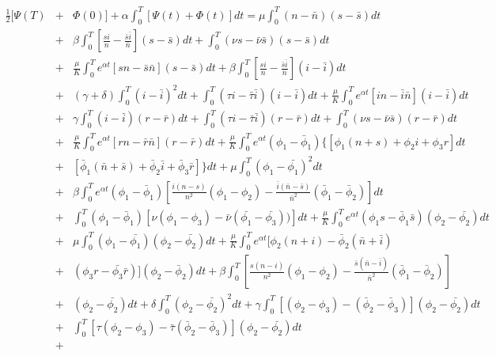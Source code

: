 \begin{eqnarray*}
\frac{1}{2}[\Psi(T)&+&\Phi(0)]+\alpha\int_{0}^{T}[\Psi(t)+\Phi(t)]dt=\mu\int_{0}^{T}(n-\bar{n})(s-\bar{s})dt\\
&+&\beta\int_{0}^{T}\left[\frac{si}{n}-\frac{\bar{s}\bar{i}}{\bar{n}}\right](s-\bar{s})dt+\int_{0}^{T}(\nu
 s-\bar{\nu}\bar{s})(s-\bar{s})dt\\
&+&\frac{\mu}{K}\int_{0}^{T} e^{\alpha 
t}\left[sn-\bar{s}\bar{n}\right](s-\bar{s})dt+\beta\int_{0}^{T}\left[\frac{si}{n}-\frac{\bar{s}\bar{i}}{\bar{n}}\right](i-\bar{i})dt\\
&+&(\gamma+\delta)\int_{0}^{T}(i-\bar{i})^2dt+\int_{0}^{T}(\tau 
i-\bar{\tau}\bar{i})(i-\bar{i})dt+\frac{\mu}{K}\int_{0}^{T} e^{\alpha 
t}\left[in-\bar{i}\bar{n}\right](i-\bar{i})dt\\
&+&\gamma\int_{0}^{T}(i-\bar{i})(r-\bar{r})dt+\int_{0}^{T}(\tau 
i-\bar{\tau}\bar{i})(r-\bar{r})dt+\int_{0}^{T}(\nu 
s-\bar{\nu}\bar{s})(r-\bar{r})dt\\
&+&\frac{\mu}{K}\int_{0}^{T} e^{\alpha 
t}\left[rn-\bar{r}\bar{n}\right](r-\bar{r})dt+\frac{\mu}{K}\int_{0}^{T}e^{\alpha
 t}(\phi_1-\bar{\phi}_1)\{[\phi_1(n+s)+\phi_2 i +\phi_3 r]dt\\
&+&[\bar{\phi}_1(\bar{n}+\bar{s})+\bar{\phi}_2 \bar{i} +\bar{\phi}_3 
\bar{r}]\}dt+\mu\int_{0}^{T}(\phi_1-\bar{\phi_1})^2dt\\
&+&\beta\int_{0}^{T}e^{\alpha 
t}(\phi_1-\bar{\phi}_1)\left[\frac{i(n-s)}{n^2}(\phi_1-\phi_2)-\frac{\bar{i}(\bar{n}-\bar{s})}{\bar{n}^2}(\bar{\phi}_1-\bar{\phi}_2)\right]dt\\
&+&\int_{0}^{T} 
(\phi_1-\bar{\phi}_1)[\nu(\phi_1-\phi_3)-\bar{\nu}(\bar{\phi_1}-\bar{\phi_3}))]dt+\frac{\mu}{K}\int_{0}^{T}e^{\alpha
 t}(\phi_1s-\bar{\phi}_1\bar{s})(\phi_2-\bar{\phi_2})dt\\
&+&\mu\int_{0}^{T}(\phi_1-\bar{\phi_1})(\phi_2-\bar{\phi_2})dt+\frac{\mu}{K}\int_{0}^{T}e^{\alpha
 t}[\phi_2(n+i)-\bar{\phi}_2(\bar{n}+\bar{i}) \nonumber\\
&+& (\phi_3 
r-\bar{\phi_3}\bar{r})](\phi_2-\bar{\phi}_2)dt+\beta\int_{0}^{T}\left[\frac{s(n-i)}{n^2}(\phi_1-\phi_2)-\frac{\bar{s}(\bar{n}-\bar{i})}{\bar{n}^2}(\bar{\phi}_1-\bar{\phi}_2)\right]
 \nonumber\\
&+&(\phi_2-\bar{\phi_2})dt+\delta\int_{0}^{T}(\phi_2-\bar{\phi_2})^2dt 
+\gamma\int_{0}^{T}[(\phi_2-\phi_3)-(\bar{\phi}_2-\bar{\phi}_3)](\phi_2-\bar{\phi_2})dt
 \nonumber\\
&+&\int_{0}^{T}[\tau(\phi_2-\phi_3)-\bar{\tau}(\bar{\phi}_2-\bar{\phi}_3)](\phi_2-\bar{\phi_2})dt\\&+&

\end{eqnarray*}
